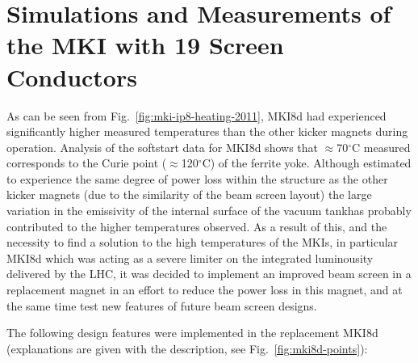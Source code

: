 \section{Simulations and Measurements of the MKI with 19 Screen Conductors}

As can be seen from Fig.~\ref{fig:mki-ip8-heating-2011}, MKI8d had experienced significantly higher measured temperatures than the other kicker magnets during operation. Analysis of the softstart data for MKI8d shows that $\approx$70$^{\circ}$C measured corresponds to the Curie point ($\approx$120$^{\circ}$C) of the ferrite yoke. Although estimated to experience the same degree of power loss within the structure as the other kicker magnets (due to the similarity of the beam screen layout) the large variation in the emissivity of the internal surface of the vacuum tankhas probably contributed to the higher temperatures observed. As a result of this, and the necessity to find a solution to the high temperatures of the MKIs, in particular MKI8d which was acting as a severe limiter on the integrated luminousity delivered by the LHC, it was decided to implement an improved beam screen in a replacement magnet in an effort to reduce the power loss in this magnet, and at the same time test new features of future beam screen designs.

The following design features were implemented in the replacement MKI8d (explanations are given with the description, see Fig.~\ref{fig:mki8d-points}):

